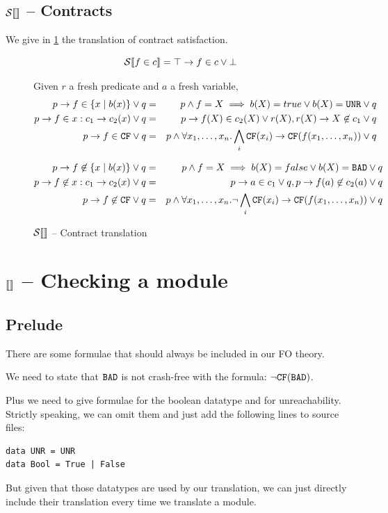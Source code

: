 \documentclass[preprint]{sigplanconf}
\begin{document}
\subsection{$\mathcal{S} \llbracket  \rrbracket$ -- Contracts}
We give in \ref{strans} the translation of contract satisfaction.

\begin{figure}
$$ \mathcal{S} \llbracket f \in c \rrbracket = \top \to f \in c \lor \bot $$

Given $r$ a fresh predicate and $a$ a fresh variable,
\begin{eqnarray*}
  p \to f \in \{x \mid b(x) \} \lor q &=& p \land f=X \implies b(X)=true \lor b(X) = \texttt{UNR} \lor q  \\
  p \to f \in x:c_1 \to c_2(x) \lor q &=&  p \to f(X) \in c_2(X) \lor r(X), r(X) \to X \not \in c_1 \lor q \\
  p \to f \in \texttt{CF} \lor q &=& p \land \forall x_1,\dots,x_n. \bigwedge_i \texttt{CF}(x_i) \to \texttt{CF}(f(x_1,\dots,x_n)) \lor q 
\end{eqnarray*}

\begin{eqnarray*}
  p \to f \not \in \{x \mid b(x) \} \lor q &=&  p \land f=X \implies b(X)=false \lor b(X) = \texttt{BAD} \lor q  \\
  p \to f \not \in x:c_1 \to c_2(x) \lor q &=&  p \to a \in c_1 \lor q, p \to f(a) \not \in c_2(a) \lor q \\
  p \to f \not \in \texttt{CF} \lor q &=&  p \land \forall x_1,\dots,x_n. \lnot \bigwedge_i \texttt{CF}(x_i) \to \texttt{CF}(f(x_1,\dots,x_n)) \lor q 
\end{eqnarray*}
\caption{$\mathcal{S} \llbracket  \rrbracket$ -- Contract translation}
\label{strans}
\end{figure}

\section{$\llbracket  \rrbracket$ -- Checking a module}

\subsection{Prelude}
There are some formulae that should always be included in our FO theory.

We need to state that $\texttt{BAD}$ is not crash-free with the formula:
$\lnot \texttt{CF}(\texttt{BAD})$.

Plus we need to give formulae for the boolean datatype and for
 unreachability. Strictly speaking, we can omit them and just add the
following lines to source files:
\begin{verbatim}
data UNR = UNR
data Bool = True | False
\end{verbatim}
But given that those datatypes are used by our translation, we can
just directly include their translation every time we translate a
module.
\end{document}
